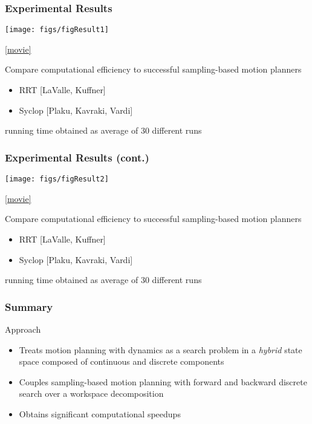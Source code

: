 \documentclass[10pt,t]{beamer}
\begin{document}
\begin{frame}
\frametitle{Experimental Results}


\texttt{[image: figs/figResult1]}

\vspace*{-2mm}
\href{run:movieResult1.wmv}{\footnotesize{\hfill{[movie]}}}

Compare computational efficiency to successful sampling-based motion planners
\begin{itemize}
\item RRT [LaValle, Kuffner]
\item Syclop [Plaku, Kavraki, Vardi]
\end{itemize}
running time obtained as average of 30 different
    runs

\end{frame}


\begin{frame}
\frametitle{Experimental Results (cont.)}


\texttt{[image: figs/figResult2]}

\vspace*{-2mm}
\href{run:movieResult2.wmv}{\footnotesize{\hfill{[movie]}}}

Compare computational efficiency to successful sampling-based motion planners
\begin{itemize}
\item RRT [LaValle, Kuffner]
\item Syclop [Plaku, Kavraki, Vardi]
\end{itemize}
running time obtained as average of 30 different
    runs

\end{frame}


\begin{frame}
\frametitle{Summary}


Approach
\begin{itemize}
\item Treats motion planning with dynamics as a search problem in a \emph{hybrid} state space composed of continuous and discrete components

\vspace*{4mm}

\item  Couples sampling-based motion planning with forward and backward discrete search over a workspace decomposition

\vspace*{4mm}

\item Obtains significant computational speedups 
\end{itemize}

\end{frame}
\end{document}
